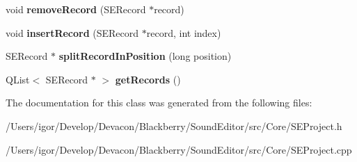 \begin{DoxyCompactItemize}
\item 
\hypertarget{class_s_e_project_a960cb8f84ef856c84ed27da15adb3eeb}{void {\bfseries remove\+Record} (S\+E\+Record $\ast$record)}\label{class_s_e_project_a960cb8f84ef856c84ed27da15adb3eeb}

\item 
\hypertarget{class_s_e_project_ad509d4afbd0a2ce3973c92179fe31eec}{void {\bfseries insert\+Record} (S\+E\+Record $\ast$record, int index)}\label{class_s_e_project_ad509d4afbd0a2ce3973c92179fe31eec}

\item 
\hypertarget{class_s_e_project_a3d61ce7fe9afeed0a461d47232498148}{S\+E\+Record $\ast$ {\bfseries split\+Record\+In\+Position} (long position)}\label{class_s_e_project_a3d61ce7fe9afeed0a461d47232498148}

\item 
\hypertarget{class_s_e_project_a27d4de382ffc61d9b92235704a554ebd}{Q\+List$<$ S\+E\+Record $\ast$ $>$ {\bfseries get\+Records} ()}\label{class_s_e_project_a27d4de382ffc61d9b92235704a554ebd}

\end{DoxyCompactItemize}


The documentation for this class was generated from the following files\+:\begin{DoxyCompactItemize}
\item 
/\+Users/igor/\+Develop/\+Devacon/\+Blackberry/\+Sound\+Editor/src/\+Core/S\+E\+Project.\+h\item 
/\+Users/igor/\+Develop/\+Devacon/\+Blackberry/\+Sound\+Editor/src/\+Core/S\+E\+Project.\+cpp\end{DoxyCompactItemize}
